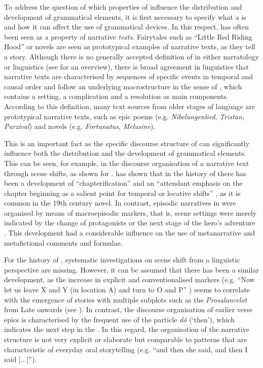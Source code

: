 \documentclass[output=paper,colorlinks,citecolor=brown]{langscibook}
\begin{document}
To address the question of which properties of  influence the distribution and development of grammatical elements, it is first necessary to specify what a  is and how it can affect the use of grammatical devices. In this respect,  has often been seen as a property of narrative \textit{texts}. Fairytales such as “Little Red Riding Hood” or novels are seen as prototypical examples of narrative texts, as they tell a story. Although there is no generally accepted definition of  in either narratology or linguistics (see \citealt{Zeman2018} for an overview), there is broad agreement in linguistics that narrative texts are characterised by sequences of specific events in temporal and causal order and follow an underlying macrostructure in the sense of \citet{LabovWaletzky1967}, which contains a setting, a complication and a resolution as main components. According to this definition, many text sources from older stages of language are prototypical narrative texts, such as  epic poems (e.g. \textit{Nibelungenlied}, \textit{Tristan}, \textit{Parzival}) and  novels (e.g. \textit{Fortunatus}, \textit{Melusine}). 

This is an important fact as the specific discourse structure of  can significantly influence both the distribution and the development of grammatical elements. This can be seen, for example, in the discourse organisation of a narrative text through scene shifts, as shown for . \citet{Fludernik2003} has shown that in the history of  there has been a development of “chapterification” and an “attendant emphasis on the chapter beginning as a salient point for temporal or locative shifts” \citep[337]{Fludernik2003}, as it is common in the 19th century novel. In contrast, episodic narratives in  were organised by means of macroepisodic markers, that is, scene settings were merely indicated by the change of protagonists or the next stage of the hero's adventure \citep[337]{Fludernik2003}. This development had a considerable influence on the use of metanarrative and metafictional comments and formulae. 

For the history of , systematic investigations on scene shift from a linguistic perspective are missing. However, it can be assumed that there has been a similar development, as the increase in explicit and conventionalised  markers (e.g. “Now let us leave X and Y (in location A) and turn to O and P” \citep[334]{Fludernik2003}) seems to correlate with the emergence of stories with multiple subplots such as the \textit{Prosalancelot} from Late  onwards (see \citealt[699f.]{Zeman2023b}). In contrast, the discourse organisation of earlier  verse epics is characterised by the frequent use of the particle \textit{dô} (‘then'), which indicates the next step in the . In this regard, the organisation of the narrative structure is not very explicit or elaborate but comparable to patterns that are characteristic of everyday oral storytelling (e.g. “and then she said, and then I said [...]”).
\end{document}
